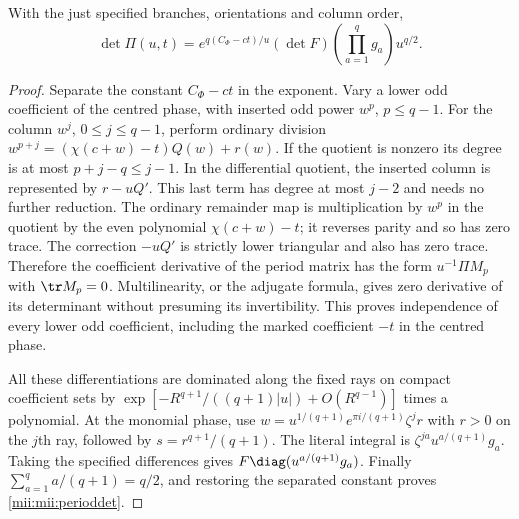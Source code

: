 \begin{theorem}\label{mii:mii:periodtheorem}
With the just specified branches, orientations and column order,
\begin{equation}\tag{MII27}\label{mii:mii:perioddet}
 \det\Pi(u,t)=
 e^{q(C_\Phi-ct)/u}(\det F)
                 \left(\prod_{a=1}^qg_a\right)u^{q/2}.
\end{equation}
\end{theorem}
\begin{proof}
Separate the constant $C_\Phi-ct$ in the exponent. Vary a lower
odd coefficient of the centred phase, with inserted odd power
$w^p$, $p\le q-1$. For the column $w^j$, $0\le j\le q-1$,
perform ordinary division
$w^{p+j}=(\chi(c+w)-t)Q(w)+r(w)$. If the quotient is nonzero
its degree is at most $p+j-q\le j-1$. In the differential
quotient, the inserted column is represented by
$r-uQ'$. This last term has degree at most $j-2$ and needs no
further reduction. The ordinary remainder map is multiplication
by $w^p$ in the quotient by the even polynomial $\chi(c+w)-t$;
it reverses parity and so has zero trace. The correction
$-uQ'$ is strictly lower triangular and also has zero trace.
Therefore the coefficient derivative of the period matrix has
the form $u^{-1}\Pi M_p$ with $\tr M_p=0$. Multilinearity, or
the adjugate formula, gives zero derivative of its determinant
without presuming its invertibility. This proves independence
of every lower odd coefficient, including the marked coefficient
$-t$ in the centred phase.

All these differentiations are dominated along the fixed rays
on compact coefficient sets by
$\exp[-R^{q+1}/((q+1)|u|)+O(R^{q-1})]$ times a polynomial.
At the monomial phase, use
$w=u^{1/(q+1)}e^{\pi i/(q+1)}\zeta^j r$ with $r>0$ on the
$j$th ray, followed by $s=r^{q+1}/(q+1)$. The literal integral
is $\zeta^{ja}u^{a/(q+1)}g_a$. Taking the specified differences
gives $F\diag(u^{a/(q+1)}g_a)$. Finally
$\sum_{a=1}^q a/(q+1)=q/2$, and restoring the separated
constant proves \eqref{mii:mii:perioddet}.
\end{proof}

